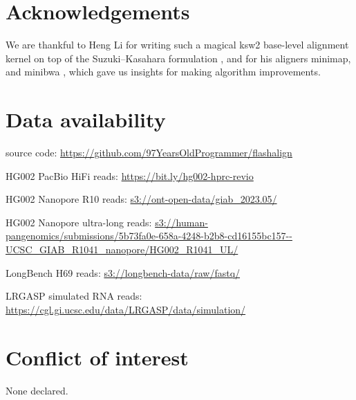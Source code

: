 \section*{Acknowledgements}
We are thankful to Heng Li for writing such a magical ksw2 base-level alignment kernel on top of the Suzuki--Kasahara formulation \citep{suzuki2018difference}, and for his aligners minimap, \mmtwo{} and minibwa \citep{li2016minimap,li2018minimap2,li2026minibwa}, which gave us insights for making algorithm improvements.

\section*{Data availability}
{\footnotesize\raggedright\setlength{\parskip}{0pt}\setlength{\parindent}{0pt}%
\flash{} source code: \url{https://github.com/97YearsOldProgrammer/flashalign}\par
HG002 PacBio HiFi reads: \url{https://bit.ly/hg002-hprc-revio}\par
HG002 Nanopore R10 reads: \url{s3://ont-open-data/giab_2023.05/}\par
HG002 Nanopore ultra-long reads: \url{s3://human-pangenomics/submissions/5b73fa0e-658a-4248-b2b8-cd16155bc157--UCSC_GIAB_R1041_nanopore/HG002_R1041_UL/}\par
LongBench H69 reads: \url{s3://longbench-data/raw/fastq/}\par
LRGASP simulated RNA reads: \url{https://cgl.gi.ucsc.edu/data/LRGASP/data/simulation/}\par}

\section*{Conflict of interest}
None declared.
